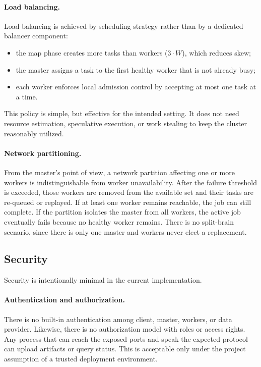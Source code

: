 \documentclass{scrartcl}
\begin{document}
\paragraph{Load balancing.}
Load balancing is achieved by scheduling strategy rather than by a dedicated balancer component:
%
\begin{itemize}
    \item the map phase creates more tasks than workers (\(3 \cdot W\)), which reduces skew;
    \item the master assigns a task to the first healthy worker that is not already busy;
    \item each worker enforces local admission control by accepting at most one task at a time.
\end{itemize}

This policy is simple, but effective for the intended setting. It does not need resource estimation, speculative execution, or work stealing to keep the cluster reasonably utilized.

\paragraph{Network partitioning.}
From the master's point of view, a network partition affecting one or more workers is indistinguishable from worker unavailability. After the failure threshold is exceeded, those workers are removed from the available set and their tasks are re-queued or replayed. If at least one worker remains reachable, the job can still complete. If the partition isolates the master from all workers, the active job eventually fails because no healthy worker remains. There is no split-brain scenario, since there is only one master and workers never elect a replacement.

\subsection{Security}\label{security}
Security is intentionally minimal in the current implementation.

\paragraph{Authentication and authorization.}
There is no built-in authentication among client, master, workers, or data provider. Likewise, there is no authorization model with roles or access rights. Any process that can reach the exposed ports and speak the expected protocol can upload artifacts or query status. This is acceptable only under the project assumption of a trusted deployment environment.
\end{document}

